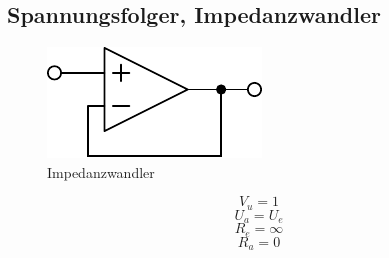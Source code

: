 



\subsection{Spannungsfolger, Impedanzwandler}
\begin{figure}[h!]
	\centering
	\includegraphics[scale=\schscale]{../fig/op_ufolg.pdf}
	\caption{Impedanzwandler}
	\label{sch:op-ufolg}
\end{figure}
\[ V_u = 1 \]
\[ U_a = U_e \]
\[ R_e = \infty \]
\[ R_a = 0 \]